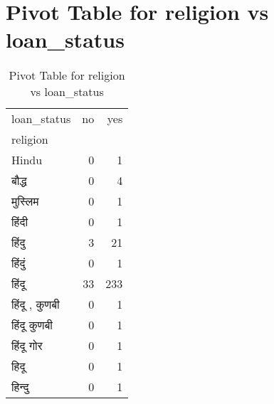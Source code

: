 \documentclass{article}
\begin{document}
\section{Pivot Table for religion vs loan_status}
\begin{table}
\caption{Pivot Table for religion vs loan_status}
\label{tab:religion_loan_status}
\begin{tabular}{lrr}
\toprule
loan_status & no & yes \\
religion &  &  \\
\midrule
Hindu & 0 & 1 \\
बौद्ध & 0 & 4 \\
मुस्लिम & 0 & 1 \\
हिंदी & 0 & 1 \\
हिंदु & 3 & 21 \\
हिंदुं & 0 & 1 \\
हिंदू & 33 & 233 \\
हिंदू , कुणबी & 0 & 1 \\
हिंदू कुणबी & 0 & 1 \\
हिंदू गोर & 0 & 1 \\
हिदू & 0 & 1 \\
हिन्दु & 0 & 1 \\
\bottomrule
\end{tabular}
\end{table}
\end{document}
